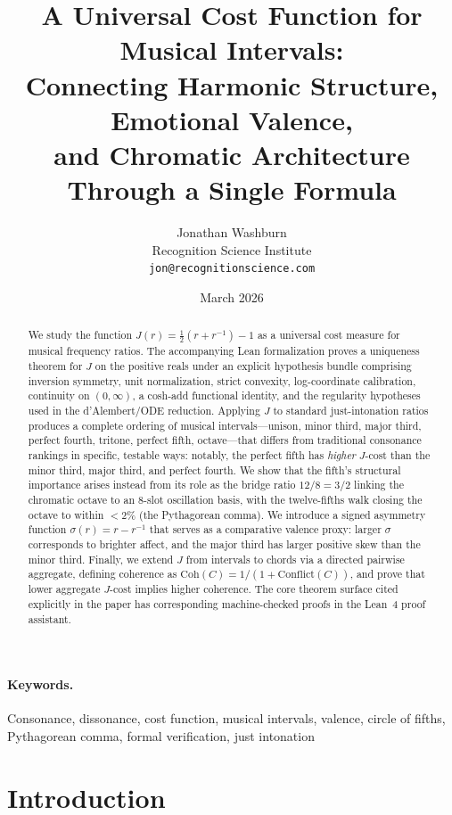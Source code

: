 \documentclass[11pt,a4paper]{article}
\title{A Universal Cost Function for Musical Intervals:\\
Connecting Harmonic Structure, Emotional Valence,\\
and Chromatic Architecture Through a Single Formula}
\author{Jonathan Washburn\\
Recognition Science Institute\\
\texttt{jon@recognitionscience.com}}
\date{March 2026}
\begin{document}
\maketitle

\begin{abstract}
We study the function $J(r)=\tfrac{1}{2}(r+r^{-1})-1$ as a universal
cost measure for musical frequency ratios.  The accompanying Lean
formalization proves a uniqueness theorem for $J$ on the positive reals
under an explicit hypothesis bundle comprising inversion symmetry, unit
normalization, strict convexity, log-coordinate calibration, continuity
on $(0,\infty)$, a cosh-add functional identity, and the regularity
hypotheses used in the d'Alembert/ODE reduction.  Applying $J$ to
standard just-intonation ratios produces a complete ordering of
musical intervals---unison, minor third, major third, perfect fourth,
tritone, perfect fifth, octave---that differs from traditional
consonance rankings in specific, testable ways: notably, the perfect
fifth has \emph{higher} $J$-cost than the minor third, major third,
and perfect fourth.  We show that the fifth's structural importance
arises instead from its role as the bridge ratio $12/8=3/2$ linking the
chromatic octave to an 8-slot oscillation basis, with the twelve-fifths
walk closing the octave to within $<2\%$ (the Pythagorean comma).  We
introduce a signed asymmetry function $\sigma(r)=r-r^{-1}$ that
serves as a comparative valence proxy: larger $\sigma$ corresponds to
brighter affect, and the major third has larger positive skew than the
minor third.  Finally, we extend $J$ from intervals to chords via a
directed pairwise aggregate, defining coherence as
$\mathrm{Coh}(C)=1/(1+\mathrm{Conflict}(C))$, and prove that lower
aggregate $J$-cost implies higher coherence.  The core theorem surface
cited explicitly in the paper has corresponding machine-checked proofs
in the Lean~4 proof assistant.
\end{abstract}

\paragraph{Keywords.} Consonance, dissonance, cost function, musical
intervals, valence, circle of fifths, Pythagorean comma, formal
verification, just intonation

\section{Introduction}
\label{sec:intro}
\end{document}
